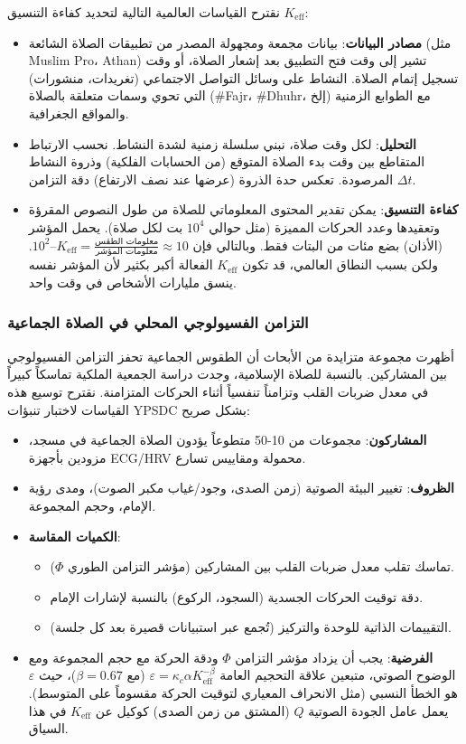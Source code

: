 \documentclass[12pt,a4paper]{article}
\newcommand{\Keff}{K_{\mathrm{eff}}}
\begin{document}
	نقترح القياسات العالمية التالية لتحديد كفاءة التنسيق \(\Keff\):
	\begin{itemize}
		\item \textbf{مصادر البيانات}: بيانات مجمعة ومجهولة المصدر من تطبيقات الصلاة الشائعة (مثل Muslim Pro، Athan) تشير إلى وقت فتح التطبيق بعد إشعار الصلاة، أو وقت تسجيل إتمام الصلاة. النشاط على وسائل التواصل الاجتماعي (تغريدات، منشورات) التي تحوي وسمات متعلقة بالصلاة (\#Fajr، \#Dhuhr، إلخ) مع الطوابع الزمنية والمواقع الجغرافية.
		\item \textbf{التحليل}: لكل وقت صلاة، نبني سلسلة زمنية لشدة النشاط. نحسب الارتباط المتقاطع بين وقت بدء الصلاة المتوقع (من الحسابات الفلكية) وذروة النشاط المرصودة. تعكس حدة الذروة (عرضها عند نصف الارتفاع) دقة التزامن \(\Delta t\).
		\item \textbf{كفاءة التنسيق}: يمكن تقدير المحتوى المعلوماتي للصلاة من طول النصوص المقرؤة وتعقيدها وعدد الحركات المميزة (مثل حوالي \(10^4\) بت لكل صلاة). يحمل المؤشر (الأذان) بضع مئات من البتات فقط. وبالتالي فإن \(\Keff = \frac{\text{معلومات الطقس}}{\text{معلومات المؤشر}} \approx 10\)–\(10^2\). ولكن بسبب النطاق العالمي، قد تكون \(\Keff\) الفعالة أكبر بكثير لأن المؤشر نفسه ينسق مليارات الأشخاص في وقت واحد.
	\end{itemize}
	
	\subsubsection{التزامن الفسيولوجي المحلي في الصلاة الجماعية}
	أظهرت مجموعة متزايدة من الأبحاث أن الطقوس الجماعية تحفز التزامن الفسيولوجي بين المشاركين. بالنسبة للصلاة الإسلامية، وجدت دراسة الجمعية الملكية \cite{RoyalSociety2024} تماسكاً كبيراً في معدل ضربات القلب وتزامناً تنفسياً أثناء الحركات المتزامنة. نقترح توسيع هذه القياسات لاختبار تنبؤات YPSDC بشكل صريح:
	
	\begin{itemize}
		\item \textbf{المشاركون}: مجموعات من 10-50 متطوعاً يؤدون الصلاة الجماعية في مسجد، مزودين بأجهزة ECG/HRV محمولة ومقاييس تسارع.
		\item \textbf{الظروف}: تغيير البيئة الصوتية (زمن الصدى، وجود/غياب مكبر الصوت)، ومدى رؤية الإمام، وحجم المجموعة.
		\item \textbf{الكميات المقاسة}:
		\begin{itemize}
			\item تماسك تقلب معدل ضربات القلب بين المشاركين (مؤشر التزامن الطوري \(\Phi\)).
			\item دقة توقيت الحركات الجسدية (السجود، الركوع) بالنسبة لإشارات الإمام.
			\item التقييمات الذاتية للوحدة والتركيز (تُجمع عبر استبيانات قصيرة بعد كل جلسة).
		\end{itemize}
		\item \textbf{الفرضية}: يجب أن يزداد مؤشر التزامن \(\Phi\) ودقة الحركة مع حجم المجموعة ومع الوضوح الصوتي، متبعين علاقة التحجيم العامة \(\varepsilon = \kappa_c \alpha \Keff^{-\beta}\) (مع \(\beta=0.67\))، حيث \(\varepsilon\) هو الخطأ النسبي (مثل الانحراف المعياري لتوقيت الحركة مقسوماً على المتوسط). يعمل عامل الجودة الصوتية \(Q\) (المشتق من زمن الصدى) كوكيل عن \(\Keff\) في هذا السياق.
	\end{itemize}
	
\end{document}
